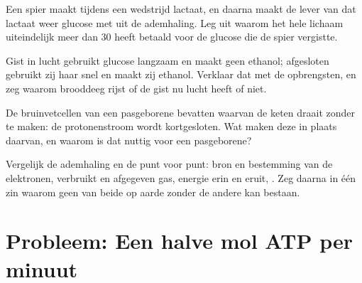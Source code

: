 \begin{exercise}[$\star\star\star$]\label{exo:g12:respiration-fermentation:12}
Een spier maakt tijdens een wedstrijd lactaat, en daarna maakt de lever
van dat lactaat weer glucose met  uit de ademhaling. Leg uit waarom het
hele lichaam uiteindelijk meer dan 30  heeft betaald voor de glucose
die de spier vergistte.
\end{exercise}

\begin{exercise}[$\star\star\star$]\label{exo:g12:respiration-fermentation:13}
Gist in lucht gebruikt glucose langzaam en maakt geen ethanol; afgesloten
gebruikt zij haar snel en maakt zij ethanol. Verklaar dat met de
opbrengsten, en zeg waarom brooddeeg rijst of de gist nu lucht heeft of
niet.
\end{exercise}

\begin{exercise}[$\star\star\star$]\label{exo:g12:respiration-fermentation:14}
De bruinvetcellen van een pasgeborene bevatten  waarvan de
keten draait zonder  te maken: de protonenstroom wordt kortgesloten.
Wat maken deze  in plaats daarvan, en waarom is dat nuttig voor een
pasgeborene?
\end{exercise}

\begin{exercise}[$\star\star\star$]\label{exo:g12:respiration-fermentation:15}
Vergelijk de ademhaling en de  punt voor punt: bron en
bestemming van de elektronen, verbruikt en afgegeven gas, energie erin en
eruit, . Zeg daarna in één zin waarom geen van beide op aarde
zonder de andere kan bestaan.
\end{exercise}

\section{Probleem: Een halve mol ATP per minuut}

